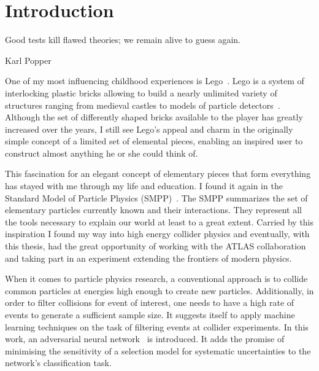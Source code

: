 

\chapter{Introduction}
\epigraph{Good tests kill flawed theories; we remain alive to guess again.}{Karl Popper}
\label{chp:intro}

One of my most influencing childhood experiences is {Lego\textsuperscript{\textregistered}}~\cite{lego}. Lego is a system of interlocking plastic bricks allowing to build a nearly unlimited variety of structures ranging from medieval castles to models of particle detectors~\cite{atlas_lego}. Although the set of differently shaped bricks available to the player has greatly increased over the years, I still see Lego's appeal and charm in the originally simple concept of a limited set of elemental pieces, enabling an inspired user to construct almost anything he or she could think of.

This fascination for an elegant concept of elementary pieces that form everything has stayed with me through my life and education. I found it again in the Standard Model of Particle Physics (SMPP)~\cite{thomson}.
The SMPP summarizes the set of elementary particles currently known and their interactions. They represent all the tools necessary to explain our world at least to a great extent.
Carried by this inspiration I found my way into high energy collider physics and eventually, with this thesis, had the great opportunity of working with the ATLAS collaboration and taking part in an experiment extending the frontiers of modern physics.

When it comes to particle physics research, a conventional approach is to collide common particles at energies high enough to create new particles. Additionally, in order to filter collisions for event of interest, one needs to have a high rate of events to generate a sufficient sample size.
It suggests itself to apply machine learning techniques on the task of filtering events at collider experiments.
In this work, an adversarial neural network~\cite{Louppe:2016ylz} is introduced. It adds the promise of minimising the sensitivity of a selection model for systematic uncertainties to the network's classification task.

